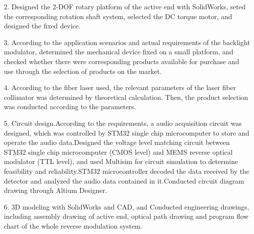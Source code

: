 2. Designed the 2-DOF rotary platform of the active end with SolidWorks, seted the corresponding rotation shaft system, selected the DC torque motor, and designed the fixed device.

3. According to the application scenarios and actual requirements of the backlight modulator, determined the mechanical device fixed on a small platform, and checked whether there were corresponding products available for purchase and use through the selection of products on the market. 


4. According to the fiber laser used, the relevant parameters of the laser fiber collimator was determined by theoretical calculation. Then, the product selection was conducted according to the parameters. 

5. Circuit design.According to the requirements, a audio acquisition circuit was designed, which was controlled by STM32 single chip microcomputer to store and operate the audio data.Designed the voltage level matching circuit between STM32 single chip microcomputer (CMOS level) and MEMS reverse optical modulator (TTL level), and used Multisim for circuit simulation to determine feasibility and reliability.STM32 microcontroller decoded the data received by the detector and analyzed the audio data contained in it.Conducted circuit diagram drawing through Altium Designer. 

6. 3D modeling with SolidWorks and CAD, and Conducted engineering drawings, including assembly drawing of active end, optical path drawing and program flow chart of the whole reverse modulation system.


